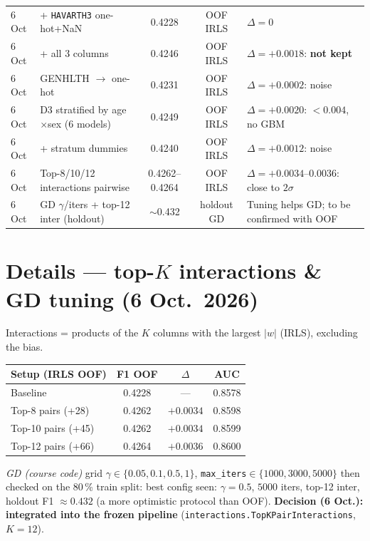\documentclass[11pt,a4paper]{article}
\begin{document}
\begin{longtable}{@{}p{2.4cm}p{5.0cm}ccp{3.8cm}@{}}
6 Oct & + \texttt{HAVARTH3} one-hot+NaN & 0.4228 & OOF IRLS & $\Delta=0$ \\
6 Oct & + all 3 columns & 0.4246 & OOF IRLS & $\Delta=+0.0018$: \textbf{not kept} \\
6 Oct & GENHLTH $\to$ one-hot & 0.4231 & OOF IRLS & $\Delta=+0.0002$: noise \\
6 Oct & D3 stratified by age$\times$sex (6 models) & 0.4249 & OOF IRLS & $\Delta=+0.0020$: $<0.004$, no GBM \\
6 Oct & + stratum dummies & 0.4240 & OOF IRLS & $\Delta=+0.0012$: noise \\
6 Oct & Top-8/10/12 interactions pairwise & 0.4262--0.4264 & OOF IRLS & $\Delta=+0.0034$--$0.0036$: close to $2\sigma$ \\
6 Oct & GD $\gamma$/iters + top-12 inter (holdout) & $\sim$0.432 & holdout GD & Tuning helps GD; to be confirmed with OOF \\
\bottomrule
\end{longtable}

\section{Details --- top-$K$ interactions \& GD tuning (6 Oct.\ 2026)}
Interactions = products of the $K$ columns with the largest $|w|$ (IRLS), excluding the bias.

\begin{center}
\begin{tabular}{@{}lccc@{}}
\toprule
Setup (IRLS OOF) & F1 OOF & $\Delta$ & AUC \\
\midrule
Baseline & 0.4228 & --- & 0.8578 \\
Top-8 pairs (+28) & 0.4262 & $+0.0034$ & 0.8598 \\
Top-10 pairs (+45) & 0.4262 & $+0.0034$ & 0.8599 \\
Top-12 pairs (+66) & 0.4264 & $+0.0036$ & 0.8600 \\
\bottomrule
\end{tabular}
\end{center}

\noindent\textit{GD (course code)} grid $\gamma\in\{0.05,0.1,0.5,1\}$,
\texttt{max\_iters}$\in\{1000,3000,5000\}$ then checked on the 80\,\% train split:
best config seen: $\gamma=0.5$, $5000$ iters, top-12 inter,
holdout F1 $\approx 0.432$ (a more optimistic protocol than OOF).
\textbf{Decision (6 Oct.): integrated into the frozen pipeline}
(\texttt{interactions.TopKPairInteractions}, $K=12$).
\end{document}
